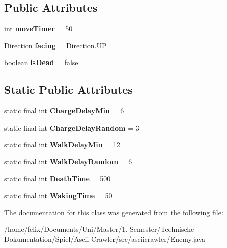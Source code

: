 \subsection*{Public Attributes}
\begin{DoxyCompactItemize}
\item 
\mbox{\label{classasciicrawler_1_1Enemy_a4521663e829959a7c25327925b8a8f40}} 
int {\bfseries move\+Timer} = 50
\item 
\mbox{\label{classasciicrawler_1_1Enemy_ab2fc6a3c9949c3d4317549f84a061ab9}} 
\hyperlink{enumasciicrawler_1_1Direction}{Direction} {\bfseries facing} = \hyperlink{enumasciicrawler_1_1Direction_a6ddc24b03c5e790038cb48cf48ed8bb0}{Direction.\+UP}
\item 
\mbox{\label{classasciicrawler_1_1Enemy_aed37076b976c543c6099e7a4199c8a18}} 
boolean {\bfseries is\+Dead} = false
\end{DoxyCompactItemize}
\subsection*{Static Public Attributes}
\begin{DoxyCompactItemize}
\item 
\mbox{\label{classasciicrawler_1_1Enemy_a68c41f5b3ff03ce66a0a7748c6dcae31}} 
static final int {\bfseries Charge\+Delay\+Min} = 6
\item 
\mbox{\label{classasciicrawler_1_1Enemy_a5d4281f4774665c377922b28bc53a142}} 
static final int {\bfseries Charge\+Delay\+Random} = 3
\item 
\mbox{\label{classasciicrawler_1_1Enemy_a90ed20929053611dcb72a406b51d38c7}} 
static final int {\bfseries Walk\+Delay\+Min} = 12
\item 
\mbox{\label{classasciicrawler_1_1Enemy_ab726ddd8887f94387edf105358a034a3}} 
static final int {\bfseries Walk\+Delay\+Random} = 6
\item 
\mbox{\label{classasciicrawler_1_1Enemy_ac44d10fa43eb6b9507eb8876f52c0d28}} 
static final int {\bfseries Death\+Time} = 500
\item 
\mbox{\label{classasciicrawler_1_1Enemy_a03cbf40a5f16e3023b00ece3bfe67554}} 
static final int {\bfseries Waking\+Time} = 50
\end{DoxyCompactItemize}


The documentation for this class was generated from the following file\+:\begin{DoxyCompactItemize}
\item 
/home/felix/\+Documents/\+Uni/\+Master/1. Semester/\+Technische Dokumentation/\+Spiel/\+Ascii-\/\+Crawler/src/asciicrawler/Enemy.\+java\end{DoxyCompactItemize}
